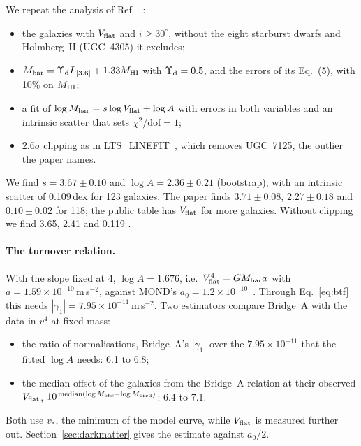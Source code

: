 We repeat the analysis of Ref.~\cite{lelli2016a} \tagP:
\begin{itemize}[nosep]
\item the galaxies with $V_{\rm flat}$ and $i\ge30^\circ$, without the eight starburst dwarfs and Holmberg~II (UGC~4305) it excludes;
\item $M_{\rm bar}=\Upsilon_{\rm d}L_{[3.6]}+1.33M_{\rm HI}$ with $\Upsilon_{\rm d}=0.5$, and the errors of its Eq.~(5), with 10\% on
$M_{\rm HI}$;
\item a fit of $\log M_{\rm bar}=s\log V_{\rm flat}+\log A$ with errors in both variables and an intrinsic scatter that sets
$\chi^2/\mathrm{dof}=1$;
\item $2.6\sigma$ clipping as in LTS\_LINEFIT~\cite{cappellari2013}, which removes UGC~7125, the outlier the paper names.
\end{itemize}
We find $s=3.67\pm0.10$ and $\log A=2.36\pm0.21$ (bootstrap), with an intrinsic scatter of 0.109\,dex for 123 galaxies. The paper finds
$3.71\pm0.08$, $2.27\pm0.18$ and $0.10\pm0.02$ for 118; the public table has $V_{\rm flat}$ for more galaxies. Without clipping we find
3.65, 2.41 and 0.119 .

\paragraph{The turnover relation.} With the slope fixed at 4, $\log A=1.676$, i.e.\ $V_{\rm flat}^4=GM_{\rm bar}a$ with
$a=1.59\times10^{-10}$\,m\,s$^{-2}$, against MOND's $a_0=1.2\times10^{-10}$~\cite{milgrom}. Through Eq.~\eqref{eq:btf} this needs
$|\gamma_1|=7.95\times10^{-11}$\,m\,s$^{-2}$. Two estimators compare Bridge~A with the data in $v^4$ at fixed mass:
\begin{itemize}[nosep]
\item the ratio of normalisations, Bridge~A's $|\gamma_1|$ over the $7.95\times10^{-11}$ that the fitted $\log A$ needs: 6.1 to 6.8;
\item the median offset of the galaxies from the Bridge~A relation at their observed $V_{\rm flat}$,
$10^{\,{\rm median}(\log M_{\rm obs}-\log M_{\rm pred})}$: 6.4 to 7.1.
\end{itemize}
Both use $v_*$, the minimum of the model curve, while $V_{\rm flat}$ is measured further out. Section~\ref{sec:darkmatter} gives the
estimate against $a_0/2$.

